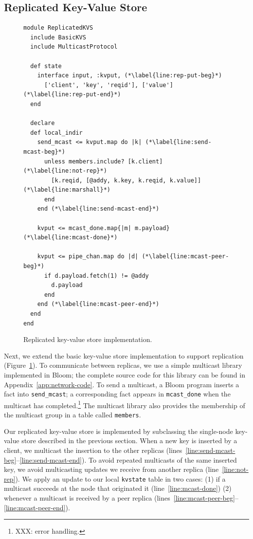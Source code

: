 \subsection{Replicated Key-Value Store}
\label{sec:rep-kvs}

\begin{figure}[t]
\begin{scriptsize}
\begin{lstlisting}
module ReplicatedKVS
  include BasicKVS
  include MulticastProtocol

  def state
    interface input, :kvput, (*\label{line:rep-put-beg}*)
      ['client', 'key', 'reqid'], ['value']  (*\label{line:rep-put-end}*)
  end

  declare
  def local_indir
    send_mcast <= kvput.map do |k| (*\label{line:send-mcast-beg}*)
      unless members.include? [k.client]  (*\label{line:not-rep}*)
        [k.reqid, [@addy, k.key, k.reqid, k.value]]   (*\label{line:marshall}*)            
      end
    end (*\label{line:send-mcast-end}*)
    
    kvput <= mcast_done.map{|m| m.payload}  (*\label{line:mcast-done}*)

    kvput <= pipe_chan.map do |d| (*\label{line:mcast-peer-beg}*)
      if d.payload.fetch(1) != @addy
        d.payload
      end
    end (*\label{line:mcast-peer-end}*)
  end
end
\end{lstlisting}
\vspace{-10pt}
\caption{Replicated key-value store implementation.}
\label{fig:kvs-repl}
\end{scriptsize}
\vspace{-2pt}
\end{figure}

Next, we extend the basic key-value store implementation to support replication
(Figure~\ref{fig:kvs-repl}). To communicate between replicas, we use a simple
multicast library implemented in Bloom; the complete source code for this
library can be found in Appendix~\ref{app:network-code}. To send a multicast, a
Bloom program inserts a fact into \texttt{send\_mcast}; a corresponding fact
appears in \texttt{mcast\_done} when the multicast has completed.\footnote{XXX:
  error handling.} The multicast library also provides the membership of the
multicast group in a table called \texttt{members}.

Our replicated key-value store is implemented by subclassing the single-node
key-value store described in the previous section. When a new key is inserted by
a client, we multicast the insertion to the other replicas
(lines~\ref{line:send-mcast-beg}--\ref{line:send-mcast-end}). To avoid repeated
multicasts of the same inserted key, we avoid multicasting updates we receive
from another replica (line~\ref{line:not-rep}). We apply an update to our local
\texttt{kvstate} table in two cases: (1) if a multicast succeeds at the node
that originated it (line~\ref{line:mcast-done}) (2) whenever a multicast is
received by a peer replica
(lines~\ref{line:mcast-peer-beg}--\ref{line:mcast-peer-end}).


